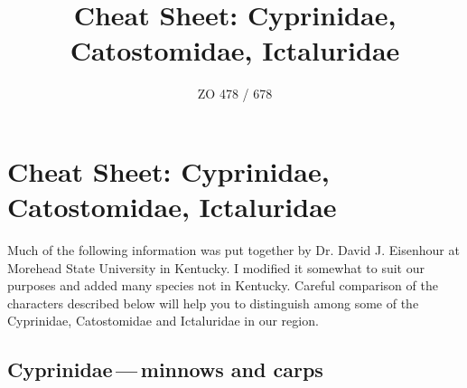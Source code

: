 \documentclass[11pt, hidelinks]{exam}
\title{Cheat Sheet: Cyprinidae, Catostomidae, Ictaluridae}
\author{ZO 478 / 678}
\date{}                                           %
\begin{document}
\section*{Cheat Sheet: Cyprinidae, Catostomidae, Ictaluridae}

Much of the following information was put together by Dr. David J. Eisenhour at Morehead State University in Kentucky.  I modified it somewhat to suit our purposes and added many species not in Kentucky. Careful comparison of the characters described below will help you to distinguish among some of the Cyprinidae, Catostomidae and Ictaluridae in our region.

\subsection*{Cyprinidae\,—\,minnows and  carps}
\end{document}
